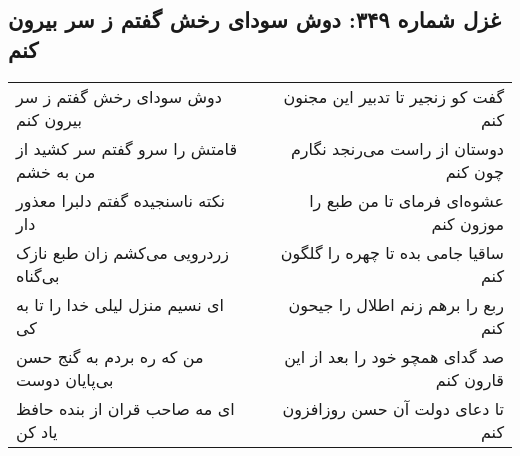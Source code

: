 \begin{center}
\section*{غزل شماره ۳۴۹: دوش سودای رخش گفتم ز سر بیرون کنم}
\label{sec:sh349}
\begin{longtable}{l p{0.5cm} r}
دوش سودای رخش گفتم ز سر بیرون کنم
&&
گفت کو زنجیر تا تدبیر این مجنون کنم
\\
قامتش را سرو گفتم سر کشید از من به خشم
&&
دوستان از راست می‌رنجد نگارم چون کنم
\\
نکته ناسنجیده گفتم دلبرا معذور دار
&&
عشوه‌ای فرمای تا من طبع را موزون کنم
\\
زردرویی می‌کشم زان طبع نازک بی‌گناه
&&
ساقیا جامی بده تا چهره را گلگون کنم
\\
ای نسیم منزل لیلی خدا را تا به کی
&&
ربع را برهم زنم اطلال را جیحون کنم
\\
من که ره بردم به گنج حسن بی‌پایان دوست
&&
صد گدای همچو خود را بعد از این قارون کنم
\\
ای مه صاحب قران از بنده حافظ یاد کن
&&
تا دعای دولت آن حسن روزافزون کنم
\\
\end{longtable}
\end{center}
